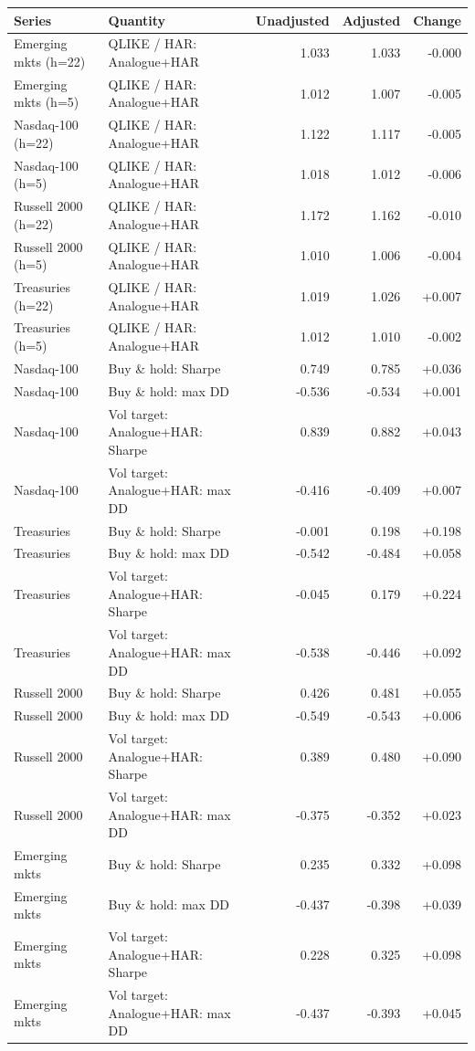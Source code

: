\begin{tabular}{llrrr}
\toprule
Series & Quantity & Unadjusted & Adjusted & Change \\
\midrule
Emerging mkts (h=22) & QLIKE / HAR: Analogue+HAR & 1.033 & 1.033 & -0.000\\
Emerging mkts (h=5) & QLIKE / HAR: Analogue+HAR & 1.012 & 1.007 & -0.005\\
Nasdaq-100 (h=22) & QLIKE / HAR: Analogue+HAR & 1.122 & 1.117 & -0.005\\
Nasdaq-100 (h=5) & QLIKE / HAR: Analogue+HAR & 1.018 & 1.012 & -0.006\\
Russell 2000 (h=22) & QLIKE / HAR: Analogue+HAR & 1.172 & 1.162 & -0.010\\
Russell 2000 (h=5) & QLIKE / HAR: Analogue+HAR & 1.010 & 1.006 & -0.004\\
Treasuries (h=22) & QLIKE / HAR: Analogue+HAR & 1.019 & 1.026 & +0.007\\
Treasuries (h=5) & QLIKE / HAR: Analogue+HAR & 1.012 & 1.010 & -0.002\\
Nasdaq-100 & Buy \& hold: Sharpe & 0.749 & 0.785 & +0.036\\
Nasdaq-100 & Buy \& hold: max DD & -0.536 & -0.534 & +0.001\\
Nasdaq-100 & Vol target: Analogue+HAR: Sharpe & 0.839 & 0.882 & +0.043\\
Nasdaq-100 & Vol target: Analogue+HAR: max DD & -0.416 & -0.409 & +0.007\\
Treasuries & Buy \& hold: Sharpe & -0.001 & 0.198 & +0.198\\
Treasuries & Buy \& hold: max DD & -0.542 & -0.484 & +0.058\\
Treasuries & Vol target: Analogue+HAR: Sharpe & -0.045 & 0.179 & +0.224\\
Treasuries & Vol target: Analogue+HAR: max DD & -0.538 & -0.446 & +0.092\\
Russell 2000 & Buy \& hold: Sharpe & 0.426 & 0.481 & +0.055\\
Russell 2000 & Buy \& hold: max DD & -0.549 & -0.543 & +0.006\\
Russell 2000 & Vol target: Analogue+HAR: Sharpe & 0.389 & 0.480 & +0.090\\
Russell 2000 & Vol target: Analogue+HAR: max DD & -0.375 & -0.352 & +0.023\\
Emerging mkts & Buy \& hold: Sharpe & 0.235 & 0.332 & +0.098\\
Emerging mkts & Buy \& hold: max DD & -0.437 & -0.398 & +0.039\\
Emerging mkts & Vol target: Analogue+HAR: Sharpe & 0.228 & 0.325 & +0.098\\
Emerging mkts & Vol target: Analogue+HAR: max DD & -0.437 & -0.393 & +0.045\\
\bottomrule
\end{tabular}
